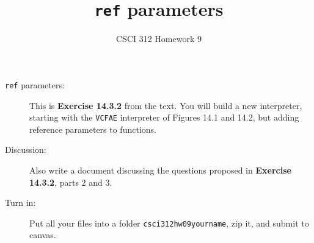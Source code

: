 \documentclass[12pt]{article}
\author{CSCI 312 Homework 9}
\title{{\tt ref} parameters}
\begin{document}
\maketitle

\begin{description}

\item[{\tt ref} parameters:]   This is {\bf Exercise 14.3.2}
from the text.  You will build a new interpreter, starting with the
{\tt VCFAE} interpreter of Figures 14.1 and 14.2, but adding
reference parameters to functions.

\item[Discussion:]  Also write a document discussing the questions
proposed in {\bf Exercise 14.3.2}, parts 2 and 3.


\item[Turn in:] Put all your files into a folder {\tt csci312hw09yourname},
zip it, and submit to canvas.
  
  
  

\end{description}
\end{document}
